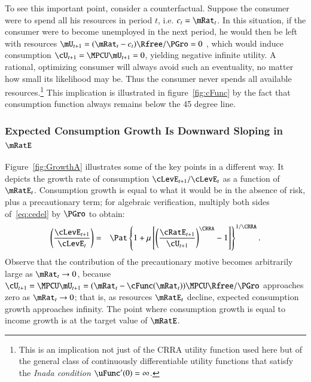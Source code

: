 \documentclass[titlepage,abstract]{\econtex}\newcommand{\texname}{ctDiscrete}
\begin{document}
To see this important point, consider a counterfactual. 
Suppose the consumer were to spend all his resources
in period $t$, i.e. $c_{t}=\mRat_{t}$. In this situation, if the
consumer were to become unemployed in the next period, he would then
be left with resources $\mU_{t+1}=(\mRat_{t}-c_{t})\Rfree/\PGro=0$
, which would induce consumption $\cU_{t+1}= \MPCU \mU_{t+1}=0$, yielding
negative infinite utility. A rational, optimizing consumer will always
avoid such an eventuality, no matter how small its likelihood may
be. Thus the consumer never spends all available resources.\footnote{This
  is an implication not just of the CRRA utility function used here
  but of the general class of continuously differentiable utility
  functions that satisfy the \textit{Inada condition} $\uFunc^{\prime}(0)
  = \infty$.}
This implication is illustrated in figure~\ref{fig:cFunc} by the
fact that consumption function always remains below the 45 degree
line.

\subsubsection{Expected Consumption Growth Is Downward Sloping in $\mRatE$}
Figure~\ref{fig:GrowthA} illustrates some of the key points in a different way. It depicts the growth rate of consumption $\cLevE_{t+1}/\cLevE_{t}$ as a function of $\mRatE_{t}$. Consumption growth is equal to what it would be in the absence of risk, plus a precautionary term; for algebraic verification, 
multiply both sides of~\eqref{eq:cedel} by $\PGro$ to obtain:
\begin{eqnarray}
  \left(\frac{\cLevE_{t+1}}{\cLevE_{t}}\right) & = &
  \Pat
   \left\{1+\urate\left[\left(\frac{\cRatE_{t+1}}{\cU_{t+1}}\right)^{\CRRA}-1\right]\right\}^{1/\CRRA}
\label{eq:euler}
.
\end{eqnarray}
Observe that the contribution of the precautionary motive becomes arbitrarily large as $\mRat_{t} \rightarrow 0$, because $\cU_{t+1} = \MPCU\mU_{t+1}  = (\mRat_{t}-\cFunc(\mRat_{t}))\MPCU\Rfree/\PGro$ approaches zero as $\mRat_{t} \rightarrow 0$; that is, as resources $\mRatE_{t}$ decline, expected consumption growth approaches infinity. The point where consumption growth is equal to income growth is at the target value of $\mRatE$.
\end{document}
